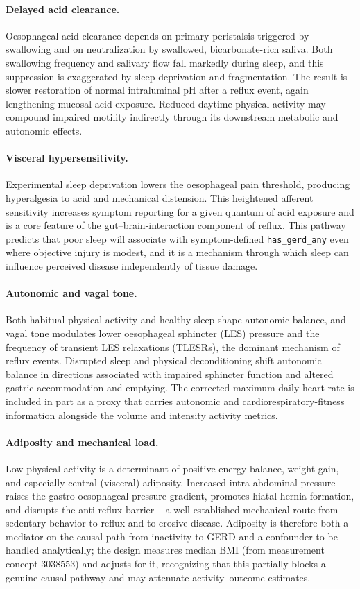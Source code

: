 \documentclass[11pt]{article}
\newcommand{\code}[1]{\texttt{\small #1}}
\begin{document}
\paragraph{Delayed acid clearance.} Oesophageal acid clearance depends on primary peristalsis triggered by swallowing and on neutralization by swallowed, bicarbonate-rich saliva. Both swallowing frequency and salivary flow fall markedly during sleep, and this suppression is exaggerated by sleep deprivation and fragmentation. The result is slower restoration of normal intraluminal pH after a reflux event, again lengthening mucosal acid exposure. Reduced daytime physical activity may compound impaired motility indirectly through its downstream metabolic and autonomic effects.

\paragraph{Visceral hypersensitivity.} Experimental sleep deprivation lowers the oesophageal pain threshold, producing hyperalgesia to acid and mechanical distension. This heightened afferent sensitivity increases symptom reporting for a given quantum of acid exposure and is a core feature of the gut--brain-interaction component of reflux. This pathway predicts that poor sleep will associate with symptom-defined \code{has_gerd_any} even where objective injury is modest, and it is a mechanism through which sleep can influence perceived disease independently of tissue damage.

\paragraph{Autonomic and vagal tone.} Both habitual physical activity and healthy sleep shape autonomic balance, and vagal tone modulates lower oesophageal sphincter (LES) pressure and the frequency of transient LES relaxations (TLESRs), the dominant mechanism of reflux events. Disrupted sleep and physical deconditioning shift autonomic balance in directions associated with impaired sphincter function and altered gastric accommodation and emptying. The corrected maximum daily heart rate is included in part as a proxy that carries autonomic and cardiorespiratory-fitness information alongside the volume and intensity activity metrics.

\paragraph{Adiposity and mechanical load.} Low physical activity is a determinant of positive energy balance, weight gain, and especially central (visceral) adiposity. Increased intra-abdominal pressure raises the gastro-oesophageal pressure gradient, promotes hiatal hernia formation, and disrupts the anti-reflux barrier -- a well-established mechanical route from sedentary behavior to reflux and to erosive disease. Adiposity is therefore both a mediator on the causal path from inactivity to GERD and a confounder to be handled analytically; the design measures median BMI (from measurement concept 3038553) and adjusts for it, recognizing that this partially blocks a genuine causal pathway and may attenuate activity--outcome estimates.
\end{document}
